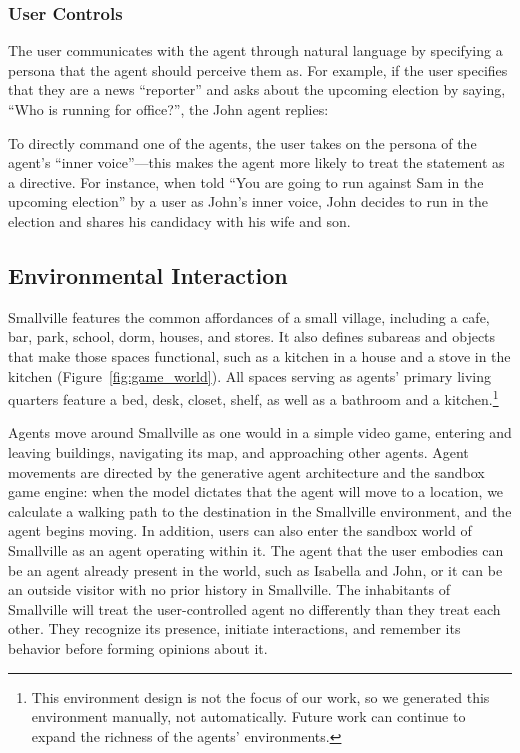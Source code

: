 \subsubsection{User Controls}
The user communicates with the agent through natural language by specifying a persona that the agent should perceive them as. For example, if the user specifies that they are a news ``reporter'' and asks about the upcoming election by saying, ``Who is running for office?'', the John agent replies:
\begin{quote}
\end{quote}
To directly command one of the agents, the user takes on the persona of the agent’s ``inner voice''---this makes the agent more likely to treat the statement as a directive. For instance, when told “You are going to run against Sam in the upcoming election” by a user as John's inner voice, John decides to run in the election and shares his candidacy with his wife and son.

\subsection{Environmental Interaction}
Smallville features the common affordances of a small village, including a cafe, bar, park, school, dorm, houses, and stores. It also defines subareas and objects that make those spaces functional, such as a kitchen in a house and a stove in the kitchen (Figure~\ref{fig:game_world}). All spaces serving as agents’ primary living quarters feature a bed, desk, closet, shelf, as well as a bathroom and a kitchen.\footnote{This environment design is not the focus of our work, so we generated this environment manually, not automatically. Future work can continue to expand the richness of the agents' environments.}

Agents move around Smallville as one would in a simple video game, entering and leaving buildings, navigating its map, and approaching other agents. Agent movements are directed by the generative agent architecture and the sandbox game engine: when the model dictates that the agent will move to a location, we calculate a walking path to the destination in the Smallville environment, and the agent begins moving. In addition, users can also enter the sandbox world of Smallville as an agent operating within it. The agent that the user embodies can be an agent already present in the world, such as Isabella and John, or it can be an outside visitor with no prior history in Smallville. The inhabitants of Smallville will treat the user-controlled agent no differently than they treat each other. They recognize its presence, initiate interactions, and remember its behavior before forming opinions about it.

